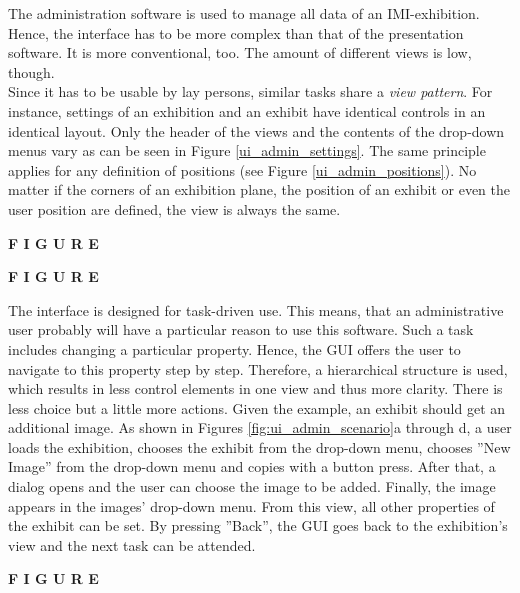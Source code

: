 The administration software is used to manage all data of an \ac{IMI}-exhibition. Hence, the interface has to be more complex than that of the presentation software. It is more conventional, too. The amount of different views is low, though. 
\\
Since it has to be usable by lay persons, similar tasks share a \textit{view pattern}. For instance, settings of an exhibition and an exhibit have identical controls in an identical layout. Only the header of the views and the contents of the drop-down menus vary as can be seen in Figure \ref{ui_admin_settings}. The same principle applies for any definition of positions (see Figure \ref{ui_admin_positions}). No matter if the corners of an exhibition plane, the position of an exhibit or even the user position are defined, the view is always the same.

\textbf{F I G U R E}

\textbf{F I G U R E}

The interface is designed for task-driven use. This means, that an administrative user probably will have a particular reason to use this software. Such a task includes changing a particular property. Hence, the \ac{GUI} offers the user to navigate to this property step by step. Therefore, a hierarchical structure is used, which results in less control elements in one view and thus more clarity. There is less choice but a little more actions. Given the example, an exhibit should get an additional image. As shown in Figures \ref{fig:ui_admin_scenario}a through d, a user loads the exhibition, chooses the exhibit from the drop-down menu, chooses ''New Image'' from the drop-down menu and copies with a button press. After that, a dialog opens and the user can choose the image to be added. Finally, the image appears in the images' drop-down menu. From this view, all other properties of the exhibit can be set. By pressing ''Back'', the \ac{GUI} goes back to the exhibition's view and the next task can be attended.

\textbf{F I G U R E}

